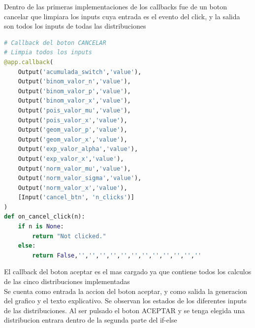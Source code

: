 \documentclass[
	12pt, %
]{fphw}
\begin{document}
Dentro de las primeras implementaciones de los callbacks fue de un boton cancelar que limpiara los inputs cuya entrada es el evento del click, y la salida son todos los inputs de todas las distribuciones
\newpage
\begin{lstlisting}[language=Python,caption=Callback Boton Cancelar]
# Callback del boton CANCELAR                                                                              
# Limpia todos los inputs                                                                                  
@app.callback(
    Output('acumulada_switch','value'),
    Output('binom_valor_n','value'),
    Output('binom_valor_p','value'),
    Output('binom_valor_x','value'),
    Output('pois_valor_mu','value'),
    Output('pois_valor_x','value'),
    Output('geom_valor_p','value'),
    Output('geom_valor_x','value'),
    Output('exp_valor_alpha','value'),
    Output('exp_valor_x','value'),
    Output('norm_valor_mu','value'),
    Output('norm_valor_sigma','value'),
    Output('norm_valor_x','value'),
    [Input('cancel_btn', 'n_clicks')]
)
def on_cancel_click(n):
    if n is None:
        return "Not clicked."
    else:
        return False,'','','','','','','','','','','',''
\end{lstlisting}
\newpage
El callback del boton aceptar es el mas cargado ya que contiene todos los calculos de las cinco distribuciones implementadas\\

Se cuenta como entrada la accion del boton aceptar, y como salida la generacion del grafico y el texto explicativo. Se observan los estados de los diferentes inputs de las distribuciones. Al ser pulsado el boton ACEPTAR y se tenga elegida una distribucion entrara dentro de la segunda parte del if-else
\end{document}
